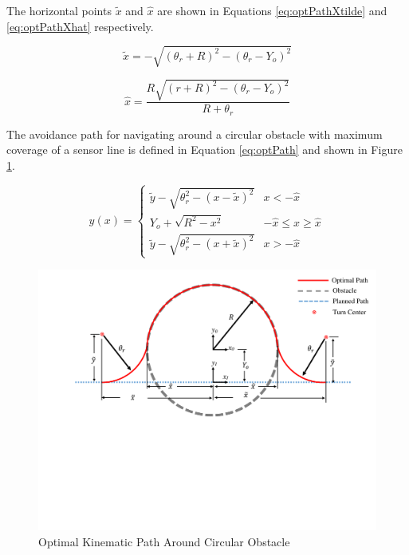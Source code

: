\documentclass[numbered,pdftex]{ohio-etd}
\begin{document}
\noindent
The horizontal points $\tilde{x}$ and $\hat{x}$ are shown in Equations \ref{eq:optPathXtilde} and \ref{eq:optPathXhat} respectively. 

\begin{equation}
\label{eq:optPathXtilde}
\widetilde{x} = -\sqrt{(\theta_r+R)^2 - (\theta_r-Y_o)^2}
\end{equation}

\begin{equation}
\label{eq:optPathXhat}
\hat{x} = \frac{R\sqrt{(r+R)^2-(\theta_r-Y_o)^2}}{R+\theta_r}
\end{equation}

\noindent
The avoidance path for navigating around a circular obstacle with maximum coverage of a sensor line is defined in Equation \ref{eq:optPath} and shown in Figure \ref{fig:optimalpath}.


\begin{equation}
\label{eq:optPath}
y(x) = \left\{
\begin{array}{ll}
\widetilde{y} -\sqrt{\theta_r^2 - (x-\widetilde{x})^2} &  x < -\hat{x} \\
Y_o +\sqrt{R^2 - x^2} & -\hat{x} \leq x \geq \hat{x}\\
\widetilde{y} -\sqrt{\theta_r^2 - (x+\widetilde{x})^2}&  x > -\hat{x}
\end{array}
\right.
\end{equation}

\begin{figure}[H]
	\centering
	\includegraphics[width=0.7\linewidth ,trim=0 265 0 20,clip,width=15cm]{Figures/optimalPath/optimalPath}
	\caption{Optimal Kinematic Path Around Circular Obstacle}
	\label{fig:optimalpath}
\end{figure}
\end{document}
